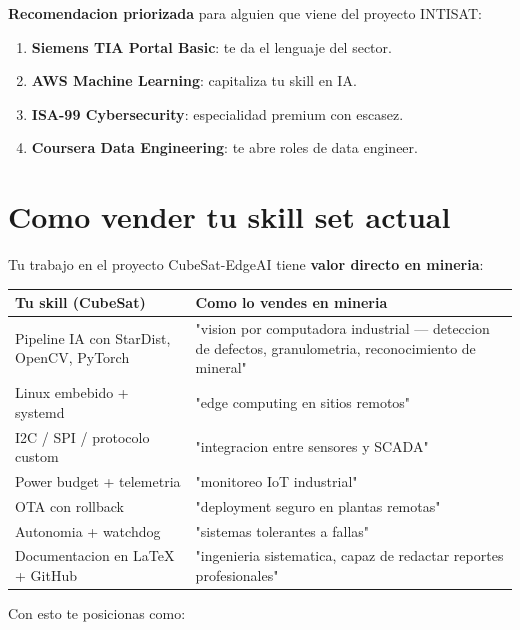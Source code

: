 \documentclass[11pt,a4paper,oneside]{report}
\begin{document}
\textbf{Recomendacion priorizada} para alguien que viene del proyecto INTISAT:

\begin{enumerate}[leftmargin=2em]
  \item \textbf{Siemens TIA Portal Basic}: te da el lenguaje del sector.
  \item \textbf{AWS Machine Learning}: capitaliza tu skill en IA.
  \item \textbf{ISA-99 Cybersecurity}: especialidad premium con escasez.
  \item \textbf{Coursera Data Engineering}: te abre roles de data engineer.
\end{enumerate}

\chapter{Como vender tu skill set actual}

Tu trabajo en el proyecto CubeSat-EdgeAI tiene \textbf{valor directo en mineria}:

\begin{center}
\begin{tabular}{p{6cm}p{6cm}}
\toprule
\textbf{Tu skill (CubeSat)} & \textbf{Como lo vendes en mineria} \\
\midrule
Pipeline IA con StarDist, OpenCV, PyTorch & "vision por computadora industrial — deteccion de defectos, granulometria, reconocimiento de mineral" \\
Linux embebido + systemd                  & "edge computing en sitios remotos" \\
I2C / SPI / protocolo custom              & "integracion entre sensores y SCADA" \\
Power budget + telemetria                 & "monitoreo IoT industrial" \\
OTA con rollback                           & "deployment seguro en plantas remotas" \\
Autonomia + watchdog                       & "sistemas tolerantes a fallas" \\
Documentacion en LaTeX + GitHub           & "ingenieria sistematica, capaz de redactar reportes profesionales" \\
\bottomrule
\end{tabular}
\end{center}

Con esto te posicionas como:
\end{document}

